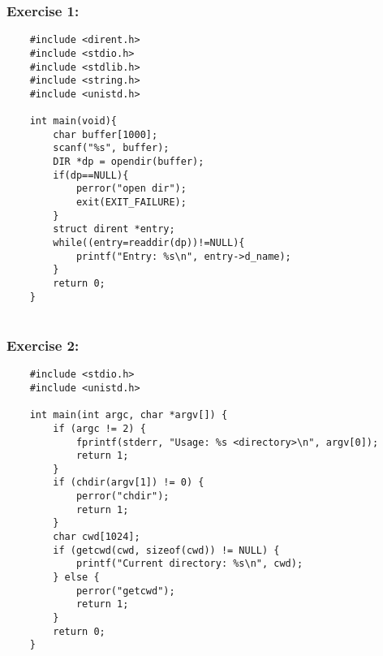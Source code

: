 \documentclass{article}
\begin{document}
\subsubsection{Exercise 1:}
\begin{verbatim}
    #include <dirent.h>
    #include <stdio.h>
    #include <stdlib.h>
    #include <string.h>
    #include <unistd.h>
    
    int main(void){
        char buffer[1000];
        scanf("%s", buffer);
        DIR *dp = opendir(buffer);
        if(dp==NULL){
            perror("open dir");
            exit(EXIT_FAILURE);
        }
        struct dirent *entry;
        while((entry=readdir(dp))!=NULL){
            printf("Entry: %s\n", entry->d_name);
        }
        return 0;
    }
    
\end{verbatim}
\subsubsection{Exercise 2:}
\begin{verbatim}
    #include <stdio.h>
    #include <unistd.h>
    
    int main(int argc, char *argv[]) {
        if (argc != 2) {
            fprintf(stderr, "Usage: %s <directory>\n", argv[0]);
            return 1;
        }
        if (chdir(argv[1]) != 0) {
            perror("chdir");
            return 1;
        }
        char cwd[1024];
        if (getcwd(cwd, sizeof(cwd)) != NULL) {
            printf("Current directory: %s\n", cwd);
        } else {
            perror("getcwd");
            return 1;
        }
        return 0;
    }
\end{verbatim}
\end{document}
